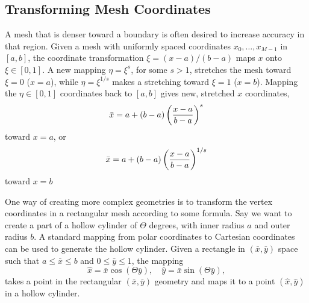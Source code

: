 \subsection{Transforming Mesh Coordinates}
\label{langtangen:mesh:transform:cyl}

A mesh that is denser toward a boundary is often desired to increase
accuracy in that region. Given a mesh with uniformly spaced
coordinates $x_0,\ldots,x_{M-1}$ in $[a,b]$, the coordinate transformation
$\xi = (x-a)/(b-a)$ maps $x$ onto $\xi\in [0,1]$. A new mapping
$\eta = \xi^s$, for some $s>1$, stretches the mesh toward $\xi=0$ ($x=a$),
while $\eta = \xi^{1/s}$ makes a stretching toward $\xi=1$ ($x=b$).
Mapping the $\eta\in[0,1]$ coordinates back to $[a,b]$ gives new,
stretched $x$ coordinates,
\begin{equation} 
\bar x = a + (b-a)\left({x-a\over b-a}\right)^s
\end{equation}
toward $x=a$, or
\begin{equation} 
\bar x = a + (b-a)\left({x-a\over b-a}\right)^{1/s}
\end{equation}
toward $x=b$

One way of creating more complex geometries is to transform the
vertex coordinates in a rectangular mesh according to some formula.
Say we want to create a part of a hollow cylinder of $\Theta$ degrees,
with inner radius $a$ and outer radius $b$. A standard mapping from polar
coordinates to Cartesian coordinates can be used to generate the
hollow cylinder. Given a rectangle in $(\bar x, \bar y)$ space such that
$a\leq \bar x\leq b$ and $0\leq \bar y\leq 1$, the mapping
\[ \hat x = \bar x\cos (\Theta \bar y),\quad \hat y = \bar x\sin (\Theta \bar y),\]
takes a point in the rectangular $(\bar x,\bar y)$ 
geometry and maps it to a point
$(\hat x, \hat y)$ in a hollow cylinder.

